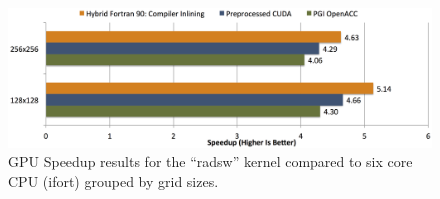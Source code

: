\begin{figure}[htpb]
        \centering
        \includegraphics[width=14cm]{figures/verificationSpeedupVS6Core}
        \caption[GPU Speedup Results of Sample Implementation Compared to Six Core]{GPU Speedup results for the ``radsw'' kernel compared to six core CPU (ifort) grouped by grid sizes.}
        \label{figure:verificationSpeedupVS6Core}
\end{figure}

%


